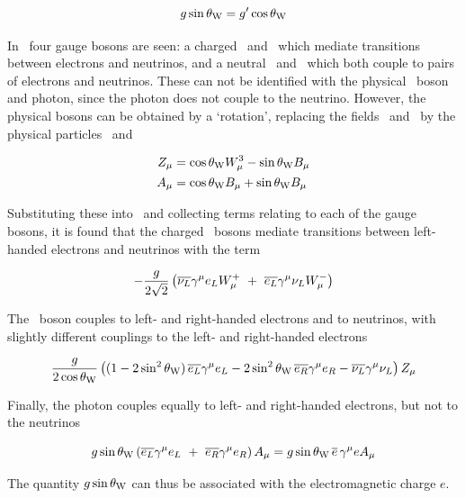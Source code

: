 \begin{equation}
g \sin{\ensuremath{\theta_{\mathrm{W}}}} = g' \cos{\ensuremath{\theta_{\mathrm{W}}}}
\end{equation}

In~ four gauge bosons are seen: a charged \Wp\ and
\Wm\ which mediate transitions between electrons and neutrinos, and a neutral
\Wthreemu\ and \Bmu\ which both couple to pairs of electrons and neutrinos.
These can not be identified with the physical \Z\ boson and photon, since the
photon does not couple to the neutrino.  However, the physical bosons can be
obtained by a `rotation', replacing the fields \Wthreemu\ and \Bmu\ by the
physical particles \Zmu\ and \Amu

\begin{align}
Z_{\mu} & = \cos{\ensuremath{\theta_{\mathrm{W}}}} W^{3}_{\mu} - \sin{\ensuremath{\theta_{\mathrm{W}}}} B_{\mu} \\
A_{\mu} & = \cos{\ensuremath{\theta_{\mathrm{W}}}} B_{\mu} + \sin{\ensuremath{\theta_{\mathrm{W}}}} B_{\mu}
\end{align}

Substituting these into~ and collecting terms
relating to each of the gauge bosons, it is found that the
charged \Wpm\ bosons mediate transitions between left-handed electrons and
neutrinos with the term

\begin{equation}
- \frac{g}{2\sqrt{2}} \left( \overline{\nu_{L}} \gamma^{\mu} e_{L} W^{+}_{\mu}
\ + \  \overline{e_{L}} \gamma^{\mu} \nu_{L} W^{-}_{\mu} \right)
\end{equation}

The \Z\ boson couples to left- and right-handed electrons and to
neutrinos, with slightly different couplings to the left- and right-handed
electrons

\begin{equation}
\frac{g}{2 \cos{\ensuremath{\theta_{\mathrm{W}}}}} \left( 
(1 - 2 \sin^{2}{\theta_{\mathrm{W}}})\, \overline{e_{L}} \gamma^{\mu} e_{L}  - 2 \sin^{2}{\theta_{\mathrm{W}}}\, \overline{e_{R}} \gamma^{\mu} e_{R} 
- \overline{\nu_{L}} \gamma^{\mu} \nu_{L} 
\right)Z_{\mu}
\end{equation}

Finally, the photon couples equally to left- and right-handed electrons, but not to the
neutrinos

\begin{equation}
g \sin{\ensuremath{\theta_{\mathrm{W}}}} \left( \overline{e_{L}} \gamma^{\mu} e_{L} 
\ + \ \overline{e_{R}} \gamma^{\mu} e_{R} \right) A_{\mu}
 = g \sin{\ensuremath{\theta_{\mathrm{W}}}} \, \overline{e}\, \gamma^{\mu} e A_{\mu}
\end{equation}

The quantity $g \sin{\ensuremath{\theta_{\mathrm{W}}}}$ can thus be associated with the electromagnetic
charge $e$. 

